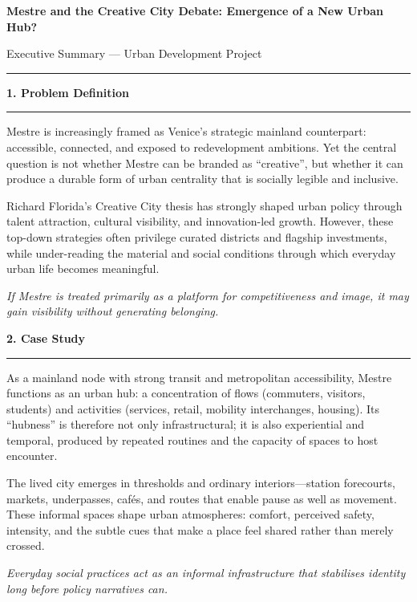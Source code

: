 \documentclass[10pt]{article}
\newcommand{\sechead}[1]{%
\vspace{2pt}%
{\color{Title}\large\bfseries #1}\par
\vspace{1pt}%
\textcolor{Rule}{\rule{\linewidth}{0.6pt}}\par
\vspace{-2pt}%
}
\begin{document}
\color{Text}

{\color{Title}\fontsize{18}{21}\selectfont\bfseries Mestre and the Creative City Debate: Emergence of a New Urban Hub?}\par
\vspace{3pt}
{\color{Muted}\normalsize Executive Summary — Urban Development Project}\par
\vspace{6pt}
\textcolor{Rule}{\rule{\linewidth}{1pt}}\par
\vspace{8pt}

\sechead{1. Problem Definition}
\justifying
Mestre is increasingly framed as Venice’s strategic mainland counterpart: accessible, connected, and exposed to redevelopment ambitions. Yet the central question is not whether Mestre can be branded as “creative”, but whether it can produce a durable form of urban centrality that is socially legible and inclusive.

Richard Florida’s Creative City thesis has strongly shaped urban policy through talent attraction, cultural visibility, and innovation-led growth. However, these top-down strategies often privilege curated districts and flagship investments, while under-reading the material and social conditions through which everyday urban life becomes meaningful.

\textit{If Mestre is treated primarily as a platform for competitiveness and image, it may gain visibility without generating belonging.}

\sechead{2. Case Study}
\justifying
As a mainland node with strong transit and metropolitan accessibility, Mestre functions as an urban hub: a concentration of flows (commuters, visitors, students) and activities (services, retail, mobility interchanges, housing). Its “hubness” is therefore not only infrastructural; it is also experiential and temporal, produced by repeated routines and the capacity of spaces to host encounter.

The lived city emerges in thresholds and ordinary interiors—station forecourts, markets, underpasses, cafés, and routes that enable pause as well as movement. These informal spaces shape urban atmospheres: comfort, perceived safety, intensity, and the subtle cues that make a place feel shared rather than merely crossed.

\textit{Everyday social practices act as an informal infrastructure that stabilises identity long before policy narratives can.}
\end{document}
